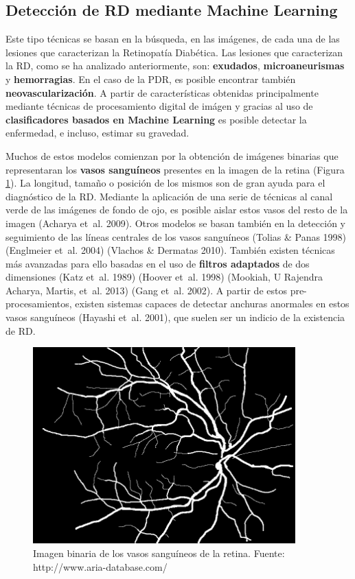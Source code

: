 \documentclass[
  12pt,
  spanish,
  a4paperpaper,
]{report}
\begin{document}
\hypertarget{detecciuxf3n-de-rd-mediante-machine-learning}{%
\subsection{Detección de RD mediante Machine
Learning}\label{detecciuxf3n-de-rd-mediante-machine-learning}}

Este tipo técnicas se basan en la búsqueda, en las imágenes, de cada una
de las lesiones que caracterizan la Retinopatía Diabética. Las lesiones
que caracterizan la RD, como se ha analizado anteriormente, son:
\textbf{exudados}, \textbf{microaneurismas} y \textbf{hemorragias}. En
el caso de la PDR, es posible encontrar también
\textbf{neovascularización}. A partir de características obtenidas
principalmente mediante técnicas de procesamiento digital de imágen y
gracias al uso de \textbf{clasificadores basados en Machine Learning} es
posible detectar la enfermedad, e incluso, estimar su gravedad.

Muchos de estos modelos comienzan por la obtención de imágenes binarias
que representaran los \textbf{vasos sanguíneos} presentes en la imagen
de la retina (Figura \ref{venas}). La longitud, tamaño o posición de los
mismos son de gran ayuda para el diagnóstico de la RD. Mediante la
aplicación de una serie de técnicas al canal verde de las imágenes de
fondo de ojo, es posible aislar estos vasos del resto de la imagen
(Acharya et~al. 2009). Otros modelos se basan también en la detección y
seguimiento de las líneas centrales de los vasos sanguíneos (Tolias \&
Panas 1998) (Englmeier et~al. 2004) (Vlachos \& Dermatas 2010). También
existen técnicas más avanzadas para ello basadas en el uso de
\textbf{filtros adaptados} de dos dimensiones (Katz et~al. 1989) (Hoover
et~al. 1998) (Mookiah, U Rajendra Acharya, Martis, et~al. 2013) (Gang
et~al. 2002). A partir de estos pre-procesamientos, existen sistemas
capaces de detectar anchuras anormales en estos vasos sanguíneos
(Hayashi et~al. 2001), que suelen ser un indicio de la existencia de RD.

\begin{figure}
\centering
\includegraphics[width=0.9\textwidth,height=\textheight]{source/figures/venas.tif}
\caption{Imagen binaria de los vasos sanguíneos de la retina. Fuente:
http://www.aria-database.com/ \label{venas}}
\end{figure}
\end{document}

